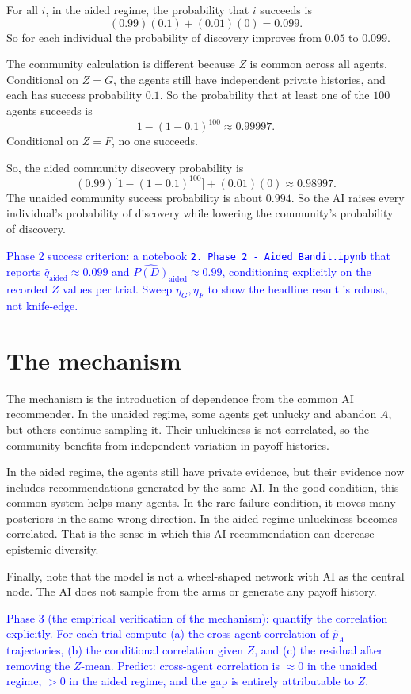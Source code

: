 \documentclass[12pt]{article}
\newcommand{\ignacio}[1]{\textcolor{blue}{#1}}
\begin{document}
For all $i$, in the aided regime, the probability that $i$ succeeds is
\[
  (0.99)(0.1) + (0.01)(0) = 0.099.
\]
So for each individual the probability of discovery improves from $0.05$ to $0.099$.

The community calculation is different because $Z$ is common across all agents.
Conditional on $Z = G$, the agents still have independent private histories, and each has success probability $0.1$.
So the probability that at least one of the $100$ agents succeeds is
\[
  1 - (1 - 0.1)^{100} \approx 0.99997.
\]
Conditional on $Z = F$, no one succeeds.

So, the aided community discovery probability is
\[
  (0.99)\bigl[1 - (1 - 0.1)^{100}\bigr] + (0.01)(0) \approx 0.98997.
\]
The unaided community success probability is about $0.994$.
So the AI raises every individual's probability of discovery while lowering the community's probability of discovery.

\ignacio{Phase 2 success criterion: a notebook \texttt{2.\ Phase 2 - Aided Bandit.ipynb} that reports $\hat q_{\text{aided}} \approx 0.099$ and $\widehat{P(D)}_{\text{aided}} \approx 0.99$, conditioning explicitly on the recorded $Z$ values per trial. Sweep $\eta_G, \eta_F$ to show the headline result is robust, not knife-edge.}

\section{The mechanism}
\label{sec:mech}

The mechanism is the introduction of dependence from the common AI recommender.
In the unaided regime, some agents get unlucky and abandon $A$, but others continue sampling it.
Their unluckiness is not correlated, so the community benefits from independent variation in payoff histories.

In the aided regime, the agents still have private evidence, but their evidence now includes recommendations generated by the same AI.
In the good condition, this common system helps many agents.
In the rare failure condition, it moves many posteriors in the same wrong direction.
In the aided regime unluckiness becomes correlated.
That is the sense in which this AI recommendation can decrease epistemic diversity.

Finally, note that the model is not a wheel-shaped network with AI as the central node.
The AI does not sample from the arms or generate any payoff history.

\ignacio{Phase 3 (the empirical verification of the mechanism): quantify the correlation explicitly. For each trial compute (a) the cross-agent correlation of $\hat p_A$ trajectories, (b) the conditional correlation given $Z$, and (c) the residual after removing the $Z$-mean. Predict: cross-agent correlation is $\approx 0$ in the unaided regime, $> 0$ in the aided regime, and the gap is entirely attributable to $Z$.}
\end{document}
